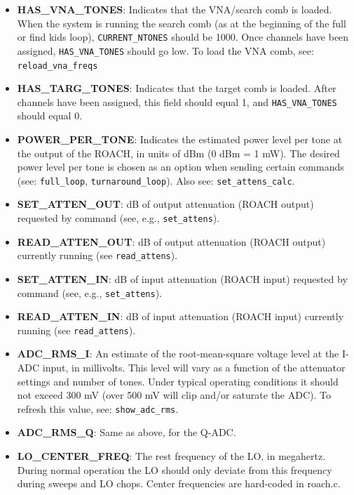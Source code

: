 \begin{itemize}[leftmargin=*,label={}]
\item \textbf{HAS\_VNA\_TONES}: Indicates that the VNA/search comb is loaded. When the system is running the search comb (as at the beginning of the full or find kids loop), \texttt{CURRENT\_NTONES} should be 1000. Once channels have been assigned, \texttt{HAS\_VNA\_TONES} should go low. To load the VNA comb, see: \texttt{reload\_vna\_freqs}

\item \textbf{HAS\_TARG\_TONES}: Indicates that the target comb is loaded. After channels have been assigned, this field should equal 1, and \texttt{HAS\_VNA\_TONES} should equal 0.

\item \textbf{POWER\_PER\_TONE}: Indicates the estimated power level per tone at the output of the ROACH, in units of dBm (0 dBm = 1 mW). The desired power level per tone is chosen as an option when sending certain commands (see: \texttt{full\_loop}, \texttt{turnaround\_loop}). Also see: \texttt{set\_attens\_calc}.

\item \textbf{SET\_ATTEN\_OUT}: dB of output attenuation (ROACH output) requested by command (see, e.g., \texttt{set\_attens}).

\item \textbf{READ\_ATTEN\_OUT}: dB of output attenuation (ROACH output) currently running (see \texttt{read\_attens}).

\item \textbf{SET\_ATTEN\_IN}: dB of input attenuation (ROACH input) requested by command (see, e.g., \texttt{set\_attens}).

\item \textbf{READ\_ATTEN\_IN}: dB of input attenuation (ROACH input) currently running (see \texttt{read\_attens}).

\item \textbf{ADC\_RMS\_I}: An estimate of the root-mean-square voltage level at the I-ADC input, in millivolts. This level will vary as a function of the attenuator settings and number of tones. Under typical operating conditions it should not exceed 300 mV (over 500 mV will clip and/or saturate the ADC). To refresh this value, see: \texttt{show\_adc\_rms}.

\item \textbf{ADC\_RMS\_Q}: Same as above, for the Q-ADC.

\item \textbf{LO\_CENTER\_FREQ}: The rest frequency of the LO, in megahertz. During normal operation the LO should only deviate from this frequency during sweeps and LO chops. Center frequencies are hard-coded in roach.c.


\end{itemize}

